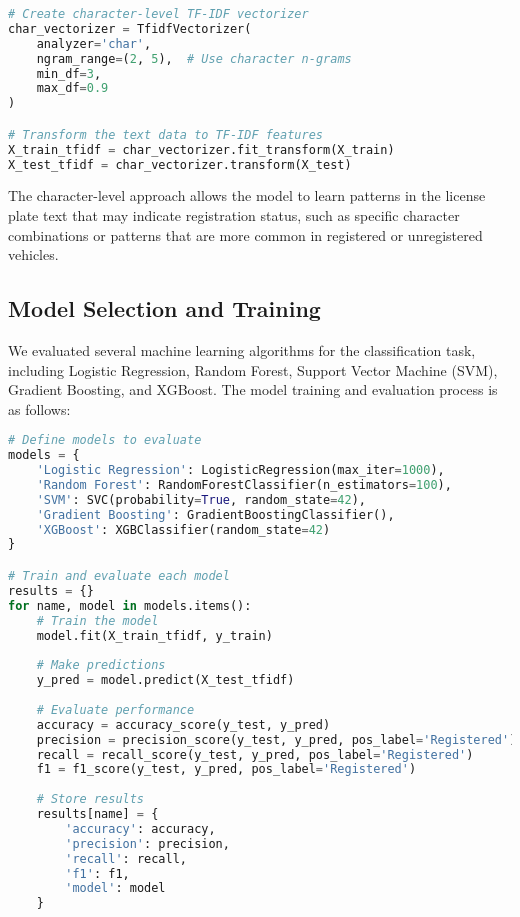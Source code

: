 \documentclass[conference]{IEEEtran}
\begin{document}
\begin{lstlisting}[language=Python, caption=Character-Level TF-IDF Vectorization]
# Create character-level TF-IDF vectorizer
char_vectorizer = TfidfVectorizer(
    analyzer='char',
    ngram_range=(2, 5),  # Use character n-grams
    min_df=3,
    max_df=0.9
)

# Transform the text data to TF-IDF features
X_train_tfidf = char_vectorizer.fit_transform(X_train)
X_test_tfidf = char_vectorizer.transform(X_test)
\end{lstlisting}

The character-level approach allows the model to learn patterns in the license plate text that may indicate registration status, such as specific character combinations or patterns that are more common in registered or unregistered vehicles.

\subsection{Model Selection and Training}
We evaluated several machine learning algorithms for the classification task, including Logistic Regression, Random Forest, Support Vector Machine (SVM), Gradient Boosting, and XGBoost. The model training and evaluation process is as follows:

\begin{lstlisting}[language=Python, caption=Model Training and Evaluation]
# Define models to evaluate
models = {
    'Logistic Regression': LogisticRegression(max_iter=1000),
    'Random Forest': RandomForestClassifier(n_estimators=100),
    'SVM': SVC(probability=True, random_state=42),
    'Gradient Boosting': GradientBoostingClassifier(),
    'XGBoost': XGBClassifier(random_state=42)
}

# Train and evaluate each model
results = {}
for name, model in models.items():
    # Train the model
    model.fit(X_train_tfidf, y_train)
    
    # Make predictions
    y_pred = model.predict(X_test_tfidf)
    
    # Evaluate performance
    accuracy = accuracy_score(y_test, y_pred)
    precision = precision_score(y_test, y_pred, pos_label='Registered')
    recall = recall_score(y_test, y_pred, pos_label='Registered')
    f1 = f1_score(y_test, y_pred, pos_label='Registered')
    
    # Store results
    results[name] = {
        'accuracy': accuracy,
        'precision': precision,
        'recall': recall,
        'f1': f1,
        'model': model
    }
\end{lstlisting}
\end{document}
